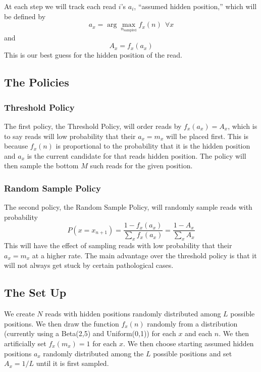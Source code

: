 \documentclass[phd,tocprelim]{cornell}
\begin{document}
At each step we will track each read $i$'s $a_{i}$,  ``assumed hidden position,'' which will be defined by
\begin{equation}
    a_{x} = \arg\max_{n_{\mbox{sampled}}} f_{x}(n) \ \ \forall x
\end{equation}
and
\begin{equation}
    A_{x} = f_{x}(a_{x})
\end{equation}
This is our best guess for the hidden position of the read.

\subsection{The Policies}

\subsubsection{Threshold Policy}

The first policy, the Threshold Policy, will order reads by $f_{x}(a_{x}) = A_{x}$, which is to say reads will low probability that their $a_{x} = m_{x}$ will be placed first. This is because $f_{x}(n)$ is proportional to the probability that it is the hidden position and $a_{x}$ is the current candidate for that reads hidden position. The policy will then sample the bottom $M$ such reads for the given position.

\subsubsection{Random Sample Policy}

The second policy, the Random Sample Policy, will randomly sample reads with probability
\begin{equation}
    P(x = x_{n+1}) = \frac{1 - f_{x}(a_{x})}{\sum_{x} f_{x}(a_{x})} = \frac{1 - A_{x}}{\sum_{x} A_{x}}
\end{equation}
This will have the effect of sampling reads with low probability that their $a_{x} = m_{x}$ at a higher rate. The main advantage over the threshold policy is that it will not always get stuck by certain pathological cases.

\subsection{The Set Up}

We create $N$ reads with hidden positions randomly distributed among $L$ possible positions. We then draw the function $f_{x}(n)$ randomly from a distribution (currently using a Beta(2,5) and Uniform(0,1)) for each $x$ and each $n$. We then artificially set $f_{x}(m_{x}) = 1$ for each $x$. We then choose starting assumed hidden positions $a_{x}$ randomly distributed among the $L$ possible positions and set $A_{x} = 1/L$ until it is first sampled.
\end{document}
